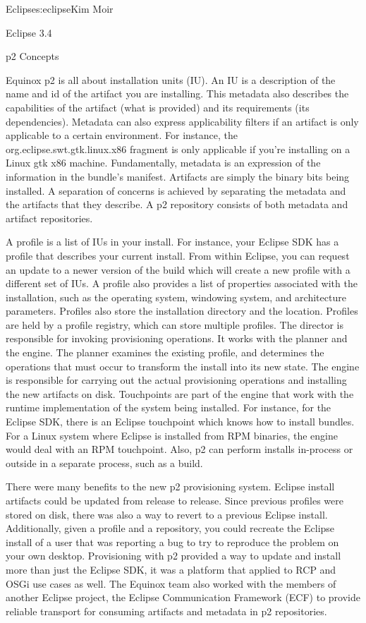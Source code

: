 \begin{aosachapter}{Eclipse}{s:eclipse}{Kim Moir}
\begin{aosasect1}{Eclipse 3.4}
\begin{aosasect2}{p2 Concepts}

Equinox p2 is all about installation units (IU). An IU is a
description of the name and id of the artifact you are
installing. This metadata also describes the capabilities of the
artifact (what is provided) and its requirements (its
dependencies). Metadata can also express applicability filters if an
artifact is only applicable to a certain environment. For instance,
the org.eclipse.swt.gtk.linux.x86 fragment is only applicable if
you're installing on a Linux gtk x86 machine. Fundamentally, metadata
is an expression of the information in the bundle's
manifest. Artifacts are simply the binary bits being installed. A
separation of concerns is achieved by separating the metadata and the
artifacts that they describe. A p2 repository consists of both
metadata and artifact repositories.


A profile is a list of IUs in your install. For instance, your Eclipse
SDK has a profile that describes your current install. From within
Eclipse, you can request an update to a newer version of the build
which will create a new profile with a different set of IUs. A profile
also provides a list of properties associated with the installation,
such as the operating system, windowing system, and architecture
parameters. Profiles also store the installation directory and the
location. Profiles are held by a profile registry, which can store
multiple profiles. The director is responsible for invoking
provisioning operations. It works with the planner and the engine. The
planner examines the existing profile, and determines the operations
that must occur to transform the install into its new state. The
engine is responsible for carrying out the actual provisioning
operations and installing the new artifacts on disk.  Touchpoints are
part of the engine that work with the runtime implementation of the
system being installed. For instance, for the Eclipse SDK, there is an
Eclipse touchpoint which knows how to install bundles. For a Linux
system where Eclipse is installed from RPM binaries, the engine would
deal with an RPM touchpoint. Also, p2 can perform installs in-process
or outside in a separate process, such as a build.

There were many benefits to the new p2 provisioning system. Eclipse
install artifacts could be updated from release to release. Since
previous profiles were stored on disk, there was also a way to revert
to a previous Eclipse install. Additionally, given a profile and a
repository, you could recreate the Eclipse install of a user that was
reporting a bug to try to reproduce the problem on your own desktop.
Provisioning with p2 provided a way to update and install more than
just the Eclipse SDK, it was a platform that applied to RCP and OSGi
use cases as well.  The Equinox team also worked with the members of
another Eclipse project, the Eclipse Communication Framework (ECF) to
provide reliable transport for consuming artifacts and metadata in p2
repositories.


\end{aosasect2}
\end{aosasect1}
\end{aosachapter}
